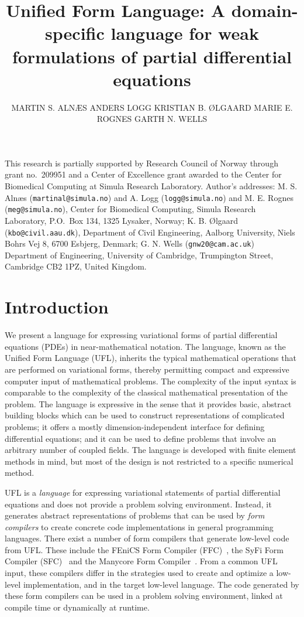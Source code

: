 \documentclass[prodmode,acmtoms]{acmsmall}
\title{Unified Form Language: A domain-specific language for weak
formulations of partial differential equations}
\author{MARTIN S. ALN{\AE}S \affil{Simula Research Laboratory}
        ANDERS LOGG \affil{Simula Research Laboratory and University of Oslo}
        KRISTIAN B. {\O}LGAARD \affil{Aalborg University}
        MARIE E. ROGNES \affil{Simula Research Laboratory}
        GARTH N. WELLS \affil{University of Cambridge}}
\begin{document}
\begin{bottomstuff}
This research is partially supported by Research Council of Norway
through grant no.~209951 and a Center of Excellence grant awarded to
the Center for Biomedical Computing at Simula Research Laboratory.
Author's addresses:
M. S. Aln{\ae}s ({\tt martinal@simula.no}) and
A. Logg ({\tt logg@simula.no}) and
M. E. Rognes ({\tt meg@simula.no}),
Center for Biomedical Computing, Simula Research Laboratory,
P.O.~Box 134, 1325 Lysaker, Norway;
K. B. {\O}lgaard ({\tt kbo@civil.aau.dk}),
Department of Civil Engineering, Aalborg University,
Niels Bohrs Vej 8, 6700 Esbjerg, Denmark;
G. N. Wells ({\tt gnw20@cam.ac.uk})
Department of Engineering, University of Cambridge,
Trumpington Street, Cambridge CB2 1PZ, United Kingdom.
\end{bottomstuff}
\maketitle

\section{Introduction}
\label{sec:introduction}

We present a language for expressing variational forms of partial
differential equations (PDEs) in near-mathematical notation.  The
language, known as the Unified Form Language (UFL), inherits the
typical mathematical operations that are performed on variational
forms, thereby permitting compact and expressive computer input of
mathematical problems. The complexity of the input syntax is
comparable to the complexity of the classical mathematical
presentation of the problem. The language is expressive in the sense
that it provides basic, abstract building blocks which can be used to
construct representations of complicated problems; it offers a mostly
dimension-independent interface for defining differential equations;
and it can be used to define problems that involve an arbitrary number
of coupled fields. The language is developed with finite element
methods in mind, but most of the design is not restricted to a
specific numerical method.

UFL is a \emph{language} for expressing variational statements of
partial differential equations and does not provide a problem solving
environment. Instead, it generates abstract representations of
problems that can be used by \emph{form compilers} to create concrete
code implementations in general programming languages. There exist a
number of form compilers that generate low-level code from UFL. These
include the FEniCS Form Compiler
(FFC)~\citep{kirby:2006,RognesKirbyEtAl2009a,oelgaard:2010,logg:2012},
the SyFi Form Compiler (SFC)~\citep{alnaes:2010,alnaes:2012} and the
Manycore Form Compiler~\citep{markall:2010,MarkallEtAl2012}. From a
common UFL input, these compilers differ in the strategies used to
create and optimize a low-level implementation, and in the target
low-level language. The code generated by these form compilers can be
used in a problem solving environment, linked at compile time or
dynamically at runtime.
\end{document}
